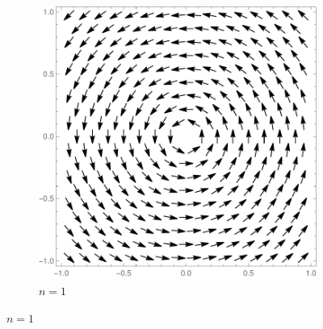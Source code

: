 \begin{figure}
\begin{subfigure}{0.45\textwidth}
		\includegraphics[scale=1,trim= 120 100 100 100,clip]{./figures/vortex2.pdf}
		\caption{$n=1$}
	\end{subfigure}
	

\end{figure}
